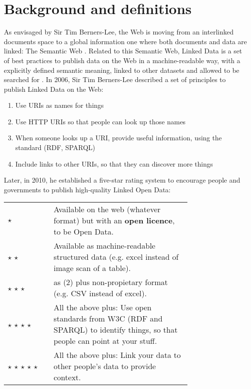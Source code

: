 \section{Background and definitions}
\label{subsec:background}

As envisaged by Sir Tim Berners-Lee, the Web is moving from an interlinked documents space to a global information one where both documents and data are linked: The Semantic Web \cite{berners2001semantic}. Related to this Semantic Web, Linked Data is a set of best practices to publish data on the Web in a machine-readable way, with a explicitly defined semantic meaning, linked to other datasets and allowed to be searched for \cite{bizer2009linked}. In 2006, Sir Tim Berners-Lee described a set of principles to publish Linked Data on the Web:

\begin{enumerate}
  \item Use URIs as names for things
  \item Use HTTP URIs so that people can look up those names
  \item When someone looks up a URI, provide useful information, using the standard (RDF, SPARQL)
  \item Include links to other URIs, so that they can discover more things \\[\baselineskip]
\end{enumerate}

Later, in 2010, he established a five-star rating system to encourage people and governments to publish high-quality Linked Open Data:\\[\baselineskip]

\begin{tabular}{ l p{0.75\linewidth} }
  $\star$ & Available on the web (whatever format) but with an \textbf{open licence}, to be Open Data. \\
  $\star$ $\star$ & Available as machine-readable structured data (e.g. excel instead of image scan of a table). \\
  $\star$ $\star$ $\star$ & as (2) plus non-propietary format (e.g. CSV instead of excel). \\
  $\star$ $\star$ $\star$ $\star$ & All the above plus: Use open standards from W3C (RDF and SPARQL) to identify things, so that people can point at your stuff. \\
  $\star$ $\star$ $\star$ $\star$ $\star$ & All the above plus: Link your data to other people's data to provide context. \\[\baselineskip]
\end{tabular}


